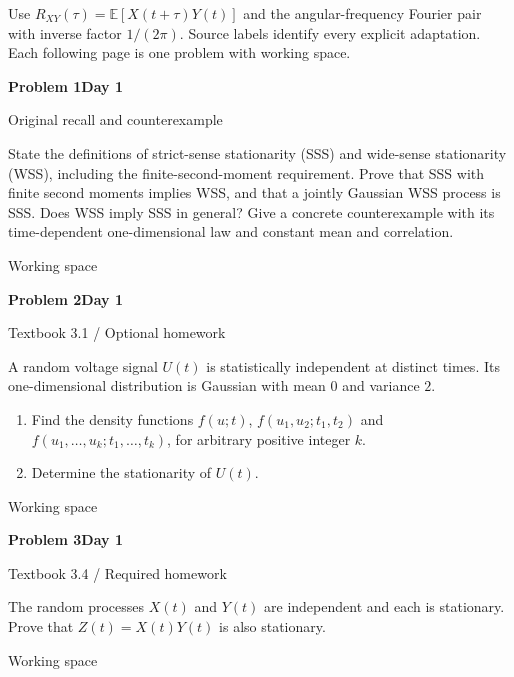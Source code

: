 \documentclass[11pt]{article}
\newcommand{\E}{\mathbb E}\newcommand{\ee}{\mathrm e}\newcommand{\jj}{\mathrm j}
\newcommand{\qtitle}[2]{\clearpage\begin{tcolorbox}[colback=navy,colframe=navy,arc=1.5pt,boxrule=0pt]\color{white}\large\bfseries #1\hfill\small #2\end{tcolorbox}}
\begin{document}
\par\smallskip Use $R_{XY}(\tau)=\E[X(t+\tau)Y(t)]$ and the angular-frequency Fourier pair with inverse factor $1/(2\pi)$. Source labels identify every explicit adaptation. Each following page is one problem with working space.
\qtitle{Problem 1}{Day 1}
{\small\color{accentred}Original recall and counterexample}\par{}\par{}\par\smallskip\begin{tcolorbox}[colback=qbg,colframe=qbg,boxrule=0pt]State the definitions of strict-sense stationarity (SSS) and wide-sense stationarity (WSS), including the finite-second-moment requirement. Prove that SSS with finite second moments implies WSS, and that a jointly Gaussian WSS process is SSS. Does WSS imply SSS in general? Give a concrete counterexample with its time-dependent one-dimensional law and constant mean and correlation.\end{tcolorbox}\smallskip\begin{workspace}\hfill{\color{linec}\footnotesize Working space}\end{workspace}
\qtitle{Problem 2}{Day 1}
{\small\color{accentred}Textbook 3.1 / Optional homework}\par{}\par{}\par\smallskip\begin{tcolorbox}[colback=qbg,colframe=qbg,boxrule=0pt]A random voltage signal $U(t)$ is statistically independent at distinct times. Its one-dimensional distribution is Gaussian with mean $0$ and variance $2$.
\begin{enumerate}
\item Find the density functions $f(u;t)$, $f(u_1,u_2;t_1,t_2)$ and $f(u_1,\ldots,u_k;t_1,\ldots,t_k)$, for arbitrary positive integer $k$.
\item Determine the stationarity of $U(t)$.
\end{enumerate}\end{tcolorbox}\smallskip\begin{workspace}\hfill{\color{linec}\footnotesize Working space}\end{workspace}
\qtitle{Problem 3}{Day 1}
{\small\color{accentred}Textbook 3.4 / Required homework}\par{}\par{}\par\smallskip\begin{tcolorbox}[colback=qbg,colframe=qbg,boxrule=0pt]The random processes $X(t)$ and $Y(t)$ are independent and each is stationary. Prove that $Z(t)=X(t)Y(t)$ is also stationary.\end{tcolorbox}\smallskip\begin{workspace}\hfill{\color{linec}\footnotesize Working space}\end{workspace}
\end{document}
